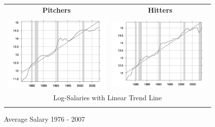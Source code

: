\documentclass[12pt]{article}
\begin{document}
\begin{figure}\caption{Average Salary 1976 - 2007}
\begin{center}
\begin{tabular}{cc}
\textbf{Pitchers} & \textbf{Hitters} \\\\
\includegraphics[scale=0.16]{pitchers/logfitsals.png} & \includegraphics[scale=0.16]{hitters/logfitsals.png} \\
\multicolumn{2}{c}{Log-Salaries with Linear Trend Line} \\\\

\end{tabular}
\end{center}
\end{figure}
\end{document}
